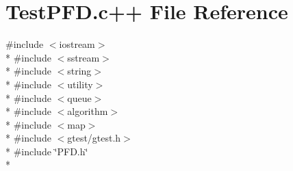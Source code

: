 \hypertarget{TestPFD_8c_09_09}{\section{Test\-P\-F\-D.\-c++ File Reference}
\label{TestPFD_8c_09_09}
}
{\ttfamily \#include $<$iostream$>$}\\*
{\ttfamily \#include $<$sstream$>$}\\*
{\ttfamily \#include $<$string$>$}\\*
{\ttfamily \#include $<$utility$>$}\\*
{\ttfamily \#include $<$queue$>$}\\*
{\ttfamily \#include $<$algorithm$>$}\\*
{\ttfamily \#include $<$map$>$}\\*
{\ttfamily \#include $<$gtest/gtest.\-h$>$}\\*
{\ttfamily \#include \char`\"{}P\-F\-D.\-h\char`\"{}}\\*
